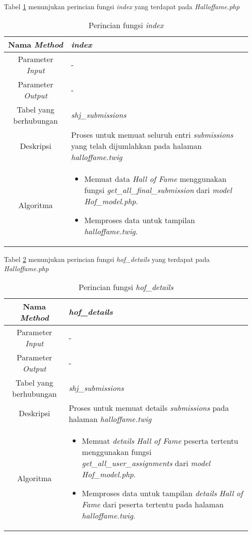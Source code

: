 \begin{enumerate}
	Tabel \ref{tab:f4hof} menunjukan perincian fungsi \textit{index} yang terdapat pada \textit{Halloffame.php}
	\begin{table}[H]
		\caption{Perincian fungsi \textit{index}}
		\label{tab:f4hof}
		\begin{tabular}{|c|p{11cm}|}
			\hline
			Nama \textit{Method} 	& 	\textit{index} 	\\
			\hline
			Parameter \textit{Input} & - \\
			\hline
			Parameter \textit{Output} &  - \\
			\hline
			Tabel yang berhubungan & \textit{shj\_submissions} \\
			\hline
			Deskripsi	& Proses untuk memuat seluruh entri \textit{submissions} yang telah dijumlahkan pada halaman \textit{halloffame.twig}	 \\
			\hline
			Algoritma	& \begin{itemize}
				\item Memuat data \textit{Hall of Fame} menggunakan fungsi \textit{get\_all\_final\_submission} dari \textit{model Hof\_model.php}.
				\item Memproses data untuk tampilan \textit{halloffame.twig}.
			\end{itemize} \\
			\hline
		\end{tabular}
	\end{table}
	
	Tabel \ref{tab:f5hof} menunjukan perincian fungsi \textit{hof\_details} yang terdapat pada \textit{Halloffame.php}
	\begin{table}[H]
		\caption{Perincian fungsi \textit{hof\_details}}
		\label{tab:f5hof}
		\begin{tabular}{|c|p{11cm}|}
			\hline
			Nama \textit{Method} 	& 	\textit{hof\_details} 	\\
			\hline
			Parameter \textit{Input} & - \\
			\hline
			Parameter \textit{Output} &  - \\
			\hline
			Tabel yang berhubungan & \textit{shj\_submissions} \\
			\hline
			Deskripsi	& Proses untuk memuat details \textit{submissions} pada halaman \textit{halloffame.twig}	 \\
			\hline
			Algoritma	& \begin{itemize}
				\item Memuat \textit{details} \textit{Hall of Fame} peserta tertentu menggunakan fungsi \textit{get\_all\_user\_assignments} dari \textit{model Hof\_model.php}.
				\item Memproses data untuk tampilan \textit{details} \textit{Hall of Fame} dari peserta tertentu pada halaman \textit{halloffame.twig}.
			\end{itemize} \\
			\hline
		\end{tabular}
	\end{table}
\end{enumerate}

